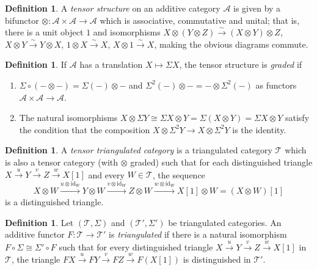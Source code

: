 \documentclass[12pt,a4paper]{article}
\theoremstyle{definition}
\newtheorem{definition}[theorem]{Definition}
\newcommand{\id}{\mathrm{id}}
\begin{document}
\begin{definition}\label{def:tensor-structure}
A \emph{tensor structure} on an additive category $\mathcal{A}$ is given by a
bifunctor $\otimes:\mathcal{A}\times\mathcal{A}\to\mathcal{A}$ which is associative,
commutative and unital; that is, there is a unit object $1$ and isomorphisms
$X\otimes(Y\otimes Z)\xrightarrow{\sim}(X\otimes Y)\otimes Z$,
$X\otimes Y\xrightarrow{\sim} Y\otimes X$, $1\otimes X\xrightarrow{\sim} X$,
$X\otimes 1\xrightarrow{\sim} X$, making the obvious diagrams commute.
\end{definition}

\begin{definition}\label{def:graded-tensor}
If $\mathcal{A}$ has a translation $X\mapsto\Sigma X$, the tensor structure is
\emph{graded} if
\begin{enumerate}
  \item $\Sigma\circ(-\otimes-) = \Sigma(-)\otimes-$ and
    $\Sigma^2(-)\otimes-= -\otimes\Sigma^2(-)$ as functors
    $\mathcal{A}\times\mathcal{A}\to\mathcal{A}$.
  \item The natural isomorphisms
    $X\otimes\Sigma Y\cong\Sigma X\otimes Y=\Sigma(X\otimes Y)=\Sigma X\otimes Y$
    satisfy the condition that the composition
    $X\otimes\Sigma^2 Y\to X\otimes\Sigma^2 Y$ is the identity.
\end{enumerate}
\end{definition}

\begin{definition}\label{def:tensor-triangulated}
A \emph{tensor triangulated category} is a triangulated category
$\mathcal{T}$ which is also a tensor category (with $\otimes$ graded) such that for
each distinguished triangle
$X\xrightarrow{u} Y\xrightarrow{v} Z\xrightarrow{w} X[1]$
and every $W\in\mathcal{T}$, the sequence
\[
  X\otimes W\xrightarrow{u\otimes\id_W} Y\otimes W
  \xrightarrow{v\otimes\id_W} Z\otimes W
  \xrightarrow{w\otimes\id_W} X[1]\otimes W = (X\otimes W)[1]
\]
is a distinguished triangle.
\end{definition}

\begin{definition}\label{def:triangulated-functor}
Let $(\mathcal{T},\Sigma)$ and $(\mathcal{T}',\Sigma')$ be triangulated categories.
An additive functor $F:\mathcal{T}\to\mathcal{T}'$ is \emph{triangulated} if there
is a natural isomorphism $F\circ\Sigma\cong\Sigma'\circ F$ such that for every
distinguished triangle $X\xrightarrow{u}Y\xrightarrow{v}Z\xrightarrow{w}X[1]$
in $\mathcal{T}$, the triangle
$FX\xrightarrow{u}FY\xrightarrow{v}FZ\xrightarrow{w}F(X[1])$ is distinguished in
$\mathcal{T}'$.
\end{definition}
\end{document}
